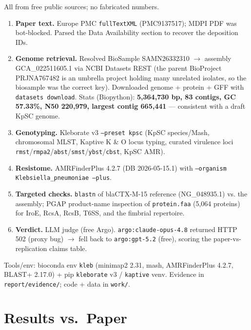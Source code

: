 \documentclass[11pt]{article}
\begin{document}
All from free public sources; no fabricated numbers.
\begin{enumerate}[leftmargin=*]
\item \textbf{Paper text.} Europe PMC \texttt{fullTextXML} (PMC9137517); MDPI PDF was bot-blocked. Parsed the Data Availability section to recover the deposition IDs.
\item \textbf{Genome retrieval.} Resolved BioSample SAMN26332310 $\rightarrow$ assembly GCA\_022511605.1 via NCBI Datasets REST (the parent BioProject PRJNA767482 is an umbrella project holding many unrelated isolates, so the biosample was the correct key). Downloaded genome + protein + GFF with \texttt{datasets download}.
Stats (Biopython): \textbf{5{,}364{,}730 bp, 83 contigs, GC 57.33\%, N50 220{,}979, largest contig 665{,}441} --- consistent with a draft KpSC genome.
\item \textbf{Genotyping.} Kleborate v3 \texttt{--preset kpsc} (KpSC species/Mash, chromosomal MLST, Kaptive K \& O locus typing, curated virulence loci \texttt{rmst}/\texttt{rmpa2}/\texttt{abst}/\texttt{smst}/\texttt{ybst}/\texttt{cbst}, KpSC AMR).
\item \textbf{Resistome.} AMRFinderPlus 4.2.7 (DB 2026-05-15.1) with \texttt{--organism Klebsiella\_pneumoniae --plus}.
\item \textbf{Targeted checks.} \texttt{blastn} of blaCTX-M-15 reference (NG\_048935.1) vs. the assembly; PGAP product-name inspection of \texttt{protein.faa} (5{,}064 proteins) for IroE, RcsA, RcsB, T6SS, and the fimbrial repertoire.
\item \textbf{Verdict.} LLM judge (free Argo). \texttt{argo:claude-opus-4.8} returned HTTP 502 (proxy bug) $\rightarrow$ fell back to \texttt{argo:gpt-5.2} (free), scoring the paper-vs-replication claims table.
\end{enumerate}

Tools/env: bioconda env \texttt{kleb} (minimap2 2.31, mash, AMRFinderPlus 4.2.7, BLAST+ 2.17.0) + pip \texttt{kleborate} v3 / \texttt{kaptive} venv. Evidence in \texttt{report/evidence/}; code + data in \texttt{work/}.

\section{Results vs.\ Paper}
\end{document}
